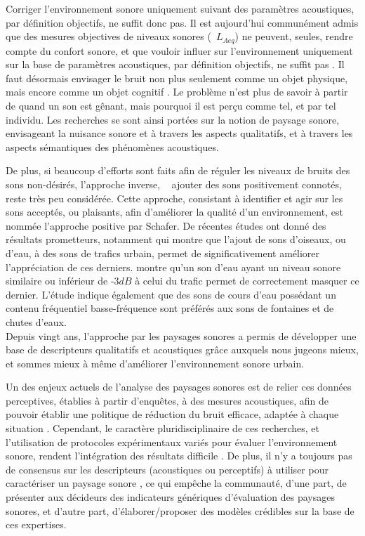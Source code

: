 {Corriger l'environnement sonore uniquement suivant des paramètres acoustiques, par définition objectifs, ne suffit donc pas. Il est aujourd'hui communément admis que des mesures objectives de niveaux sonores (\eg~$L_{Aeq}$) ne peuvent, seules, rendre compte du confort sonore, et que vouloir influer sur l'environnement uniquement sur la base de paramètres acoustiques, par définition objectifs, ne suffit pas \citep{yang2005acoustic,schulte2006soundscape,kang2010semantic,aletta2016soundscape}. Il faut désormais envisager le bruit non plus seulement comme un objet physique, mais encore comme un objet cognitif \citep{guastavino_etude_2003}. Le problème n'est plus de savoir à partir de quand un son est gênant, mais pourquoi il est perçu comme tel, et par tel individu. Les recherches se sont ainsi portées sur la notion de paysage sonore, envisageant la nuisance sonore et à travers les aspects qualitatifs, et à travers les aspects sémantiques des phénomènes acoustiques.

De plus, si beaucoup d’efforts sont faits afin de réguler les niveaux de bruits des sons non-désirés, l'approche inverse, \ie~ ajouter des sons positivement connotés, reste très peu considérée. Cette approche, consistant à identifier et agir sur les sons acceptés, ou plaisants, afin d'améliorer la qualité d'un environnement, est nommée l'approche positive par Schafer. De récentes études ont donné des résultats prometteurs, notamment \citep{hong2013designing} qui montre que l'ajout de sons d'oiseaux, ou d'eau, à des sons de trafics urbain, permet de significativement améliorer l'appréciation de ces derniers. \citep{galbrun2012perceptual} montre qu'un son d'eau ayant un niveau sonore similaire ou inférieur de -3$dB$ à celui du trafic permet de correctement masquer ce dernier. L'étude indique également que des sons de cours d'eau possédant un contenu fréquentiel basse-fréquence sont préférés aux sons de fontaines et de chutes d'eaux.\\

Depuis vingt ans, l'approche par les paysages sonores a permis de développer une base de descripteurs qualitatifs et acoustiques grâce auxquels nous jugeons mieux, et sommes mieux à même d'améliorer l'environnement sonore urbain.  \citep{kang2006urban,schulte2007soundscape}

Un des enjeux actuels de l'analyse des paysages sonores est de relier ces données perceptives, établies à partir d'enquêtes, à des mesures acoustiques, afin de pouvoir établir une politique de réduction du bruit efficace, adaptée à chaque situation \citep{schulte2013soundscape}.
Cependant, le caractère pluridisciplinaire de ces recherches, et l'utilisation de protocoles expérimentaux variés pour évaluer l'environnement sonore, rendent l’intégration des résultats difficile \citep{davies2013perception}. De plus, il n'y a toujours pas de consensus sur les descripteurs (acoustiques ou perceptifs) à utiliser pour caractériser un paysage sonore \citep{brocolini2012prediction,aletta2016soundscape}, ce qui empêche la communauté, d'une part, de présenter aux décideurs des indicateurs génériques d'évaluation des paysages sonores, et d'autre part, d'élaborer/proposer des modèles crédibles sur la base de ces expertises.

}
